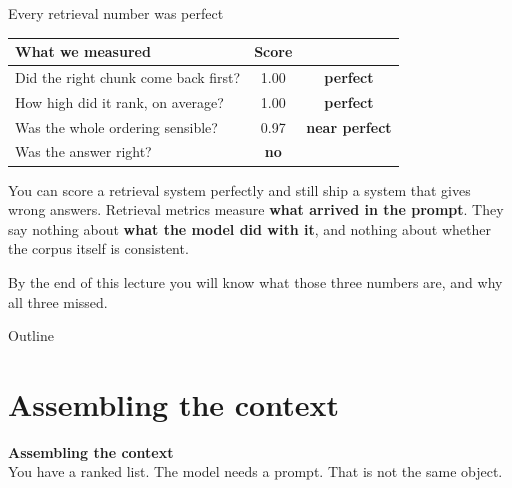 \documentclass[aspectratio=169]{beamer}
\newcommand{\trapbox}[1]{%
  \begin{tcolorbox}[colback=armred!8, colframe=armred, boxrule=0.6pt, arc=2pt]
  #1
  \end{tcolorbox}}
\newcommand{\sectiontransition}[2]{%
  \begin{frame}[plain]
    \vfill
    \begin{center}
      {\Huge\bfseries\color{popblue} #1}\\[1.1em]
      {\large #2}
    \end{center}
    \vfill
  \end{frame}}
\begin{document}
\begin{frame}{Every retrieval number was perfect}
  \vspace{0.3em}
  \begin{center}
  \small
  \begin{tabular}{lcc}
    \toprule
    \textbf{What we measured} & \textbf{Score} & \\
    \midrule
    Did the right chunk come back first?      & 1.00 & \color{paramgreen}\textbf{perfect} \\
    How high did it rank, on average?         & 1.00 & \color{paramgreen}\textbf{perfect} \\
    Was the whole ordering sensible?          & 0.97 & \color{paramgreen}\textbf{near perfect} \\
    \midrule
    Was the answer right?                     & \color{armred}\textbf{no} & \\
    \bottomrule
  \end{tabular}
  \end{center}

  \vspace{0.45em}
  \trapbox{You can score a retrieval system perfectly and still ship a system that gives
  wrong answers. Retrieval metrics measure \textbf{what arrived in the prompt}. They say
  nothing about \textbf{what the model did with it}, and nothing about whether the corpus
  itself is consistent.}

  \vspace{0.2em}
  \begin{center}
  {\small\color{gray}By the end of this lecture you will know what those three numbers are,
  and why all three missed.}
  \end{center}
\end{frame}

\begin{frame}{Outline}
  \tableofcontents
\end{frame}

\section{Assembling the context}
\sectiontransition{Assembling the context}{You have a ranked list. The model needs a
prompt. That is not the same object.}
\end{document}
